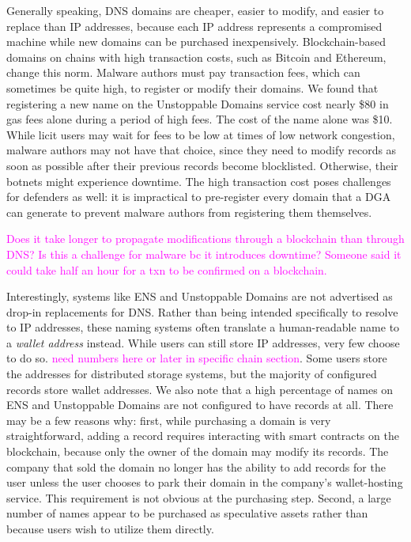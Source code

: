 \documentclass[10pt,sigconf,letterpaper]{acmart}
\newcommand{\randall}{\ding{110}\ding{43}\textcolor{magenta}}
\newcommand{\randall}{}
\begin{document}
Generally speaking, DNS domains are cheaper, easier to modify, and 
easier to replace than IP 
addresses, because each IP address represents a compromised machine while 
new domains can be 
purchased inexpensively. Blockchain-based domains on chains with high 
transaction costs, such as 
Bitcoin and Ethereum, change this norm. Malware authors must pay 
transaction fees, which can 
sometimes be quite high, to register or modify their domains. We found that 
registering a new name 
on the Unstoppable Domains service cost nearly \$80 in gas fees alone during a 
period of high fees. 
The cost of the name alone was \$10. While licit users may wait for fees to be 
low at times of low 
network congestion, malware authors may not have that choice, since they 
need to modify records as 
soon as possible after their previous records become blocklisted. Otherwise, 
their botnets might 
experience downtime. The high transaction cost poses challenges for 
defenders as well: it is 
impractical to pre-register every domain that a DGA can generate to prevent 
malware authors from 
registering them themselves. 

\randall{Does it take longer to propagate modifications through a blockchain 
than through DNS? Is this a challenge for malware bc it introduces 
downtime? 
Someone said it could take half an hour for a txn to be confirmed on a 
blockchain.}

Interestingly, systems like ENS and Unstoppable Domains are not advertised as 
drop-in replacements for DNS. Rather than being intended specifically to 
resolve to IP addresses, these naming systems often translate a human-readable 
name to a \emph{wallet address} instead. While users can still store IP 
addresses, very few choose to do so. \randall{need numbers here or later in 
specific chain section}. Some users store the addresses for distributed storage 
systems, but the majority of configured records store wallet addresses. We also 
note that a high percentage of names on ENS and Unstoppable Domains are not 
configured to have records at all. There may be a few reasons why: first, while 
purchasing a domain is very straightforward, adding a record requires 
interacting with smart contracts on the blockchain, because only the owner of 
the domain may modify its records. The company that sold the domain no longer 
has the ability to add records for the user unless the user chooses to park 
their domain in the company's wallet-hosting service. This requirement is not 
obvious at the purchasing step. Second, a large number of names appear to be 
purchased as speculative assets rather than because users wish to utilize them 
directly. 
\end{document}
